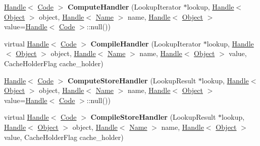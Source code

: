 \begin{DoxyCompactItemize}
\item 
\hypertarget{classv8_1_1internal_1_1_i_c_a003c5eae98ca167f8cc297ba098d18b1}{}\hyperlink{classv8_1_1internal_1_1_handle}{Handle}$<$ \hyperlink{classv8_1_1internal_1_1_code}{Code} $>$ {\bfseries Compute\+Handler} (Lookup\+Iterator $\ast$lookup, \hyperlink{classv8_1_1internal_1_1_handle}{Handle}$<$ \hyperlink{classv8_1_1internal_1_1_object}{Object} $>$ object, \hyperlink{classv8_1_1internal_1_1_handle}{Handle}$<$ \hyperlink{classv8_1_1internal_1_1_name}{Name} $>$ name, \hyperlink{classv8_1_1internal_1_1_handle}{Handle}$<$ \hyperlink{classv8_1_1internal_1_1_object}{Object} $>$ value=\hyperlink{classv8_1_1internal_1_1_handle}{Handle}$<$ \hyperlink{classv8_1_1internal_1_1_code}{Code} $>$\+::null())\label{classv8_1_1internal_1_1_i_c_a003c5eae98ca167f8cc297ba098d18b1}

\item 
\hypertarget{classv8_1_1internal_1_1_i_c_a886451651c9479a3e5e8aecf06befab0}{}virtual \hyperlink{classv8_1_1internal_1_1_handle}{Handle}$<$ \hyperlink{classv8_1_1internal_1_1_code}{Code} $>$ {\bfseries Compile\+Handler} (Lookup\+Iterator $\ast$lookup, \hyperlink{classv8_1_1internal_1_1_handle}{Handle}$<$ \hyperlink{classv8_1_1internal_1_1_object}{Object} $>$ object, \hyperlink{classv8_1_1internal_1_1_handle}{Handle}$<$ \hyperlink{classv8_1_1internal_1_1_name}{Name} $>$ name, \hyperlink{classv8_1_1internal_1_1_handle}{Handle}$<$ \hyperlink{classv8_1_1internal_1_1_object}{Object} $>$ value, Cache\+Holder\+Flag cache\+\_\+holder)\label{classv8_1_1internal_1_1_i_c_a886451651c9479a3e5e8aecf06befab0}

\item 
\hypertarget{classv8_1_1internal_1_1_i_c_af8229e802fd24e44d519f75450d883b7}{}\hyperlink{classv8_1_1internal_1_1_handle}{Handle}$<$ \hyperlink{classv8_1_1internal_1_1_code}{Code} $>$ {\bfseries Compute\+Store\+Handler} (Lookup\+Result $\ast$lookup, \hyperlink{classv8_1_1internal_1_1_handle}{Handle}$<$ \hyperlink{classv8_1_1internal_1_1_object}{Object} $>$ object, \hyperlink{classv8_1_1internal_1_1_handle}{Handle}$<$ \hyperlink{classv8_1_1internal_1_1_name}{Name} $>$ name, \hyperlink{classv8_1_1internal_1_1_handle}{Handle}$<$ \hyperlink{classv8_1_1internal_1_1_object}{Object} $>$ value=\hyperlink{classv8_1_1internal_1_1_handle}{Handle}$<$ \hyperlink{classv8_1_1internal_1_1_code}{Code} $>$\+::null())\label{classv8_1_1internal_1_1_i_c_af8229e802fd24e44d519f75450d883b7}

\item 
\hypertarget{classv8_1_1internal_1_1_i_c_a390c9f653ad732092a902aafe318e5ea}{}virtual \hyperlink{classv8_1_1internal_1_1_handle}{Handle}$<$ \hyperlink{classv8_1_1internal_1_1_code}{Code} $>$ {\bfseries Compile\+Store\+Handler} (Lookup\+Result $\ast$lookup, \hyperlink{classv8_1_1internal_1_1_handle}{Handle}$<$ \hyperlink{classv8_1_1internal_1_1_object}{Object} $>$ object, \hyperlink{classv8_1_1internal_1_1_handle}{Handle}$<$ \hyperlink{classv8_1_1internal_1_1_name}{Name} $>$ name, \hyperlink{classv8_1_1internal_1_1_handle}{Handle}$<$ \hyperlink{classv8_1_1internal_1_1_object}{Object} $>$ value, Cache\+Holder\+Flag cache\+\_\+holder)\label{classv8_1_1internal_1_1_i_c_a390c9f653ad732092a902aafe318e5ea}


\end{DoxyCompactItemize}

